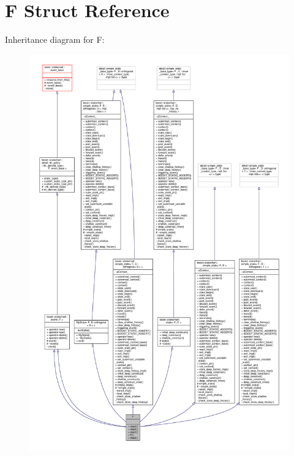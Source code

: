\hypertarget{struct_f}{}\section{F Struct Reference}
\label{struct_f}


Inheritance diagram for F\+:
\nopagebreak
\begin{figure}[H]
\begin{center}
\leavevmode
\includegraphics[width=350pt]{struct_f__inherit__graph}
\end{center}
\end{figure}


